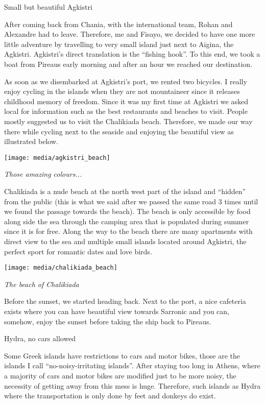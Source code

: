 \documentclass[10pt,a4paper]{article} %
\newcommand{\NewsItem}[1]{ %
\usefont{T1}{fvs}{n}{n} %
\vspace{24pt}\large #1\vspace{3pt} %
\par \normalsize \normalfont}
\begin{document}
\begin{multicols}{3}
\NewsItem{Small but beautiful Agkistri}
After coming back from Chania, with the international team, Rohan and Alexandre 
had to leave. 
Therefore, me and Fisayo, we decided to have one more little adventure by travelling 
to very small island just next to Aigina, the Agkistri. 
Agkistri's direct translation is the ``fishing hook''. 
To this end, we took a boat from Pireaus early morning and after an hour we 
reached our destination.

As soon as we disembarked at Agkistri's port, we rented two bicycles. 
I really enjoy cycling in the islands when they are not mountaineer since it 
releases childhood memory of freedom.  
Since it was my first time at Agkistri we asked local for information such as 
the best restaurants and beaches to visit. 
People mostly suggested us to visit the Chalikiada beach. 
Therefore, we made our way there while cycling next to the seaside and enjoying 
the beautiful view as illustrated below.

\begin{center}
	\texttt{[image: media/agkistri\_beach]}
	\par\textit{Those amazing colours...}
\end{center}

Chalikiada is a nude beach at the north west part of the island and ``hidden'' from 
the public (this is what we said after we passed the same road 3 times until we found 
the passage towards the beach).  
The beach is only accessible by food along side the sea through the camping area 
that is populated during summer since it is for free. 
Along the way to the beach there are many apartments with direct view to the sea 
and multiple small islands located around Agkistri, the perfect sport for 
romantic dates and love birds.

\begin{center}
	\texttt{[image: media/chalikiada\_beach]}
	\par\textit{The beach of Chalikiada}
\end{center}

Before the sunset, we started heading back. 
Next to the port, a nice cafeteria exists where you can have beautiful view 
towards Sarronic and you can, somehow, enjoy the sunset before taking the ship 
back to Pireaus.

\NewsItem{Hydra, no cars allowed}
Some Greek islands have restrictions to cars and motor bikes, those are the islands 
I call ``no-noisy-irritating islands''. 
After staying too long in Athens, where a majority of cars and motor bikes are modified 
just to be more noisy, the necessity of getting away from this mess is huge. 
Therefore, such islands as Hydra where the transportation is only done by feet and 
donkeys do exist. 


\end{multicols}
\end{document}
